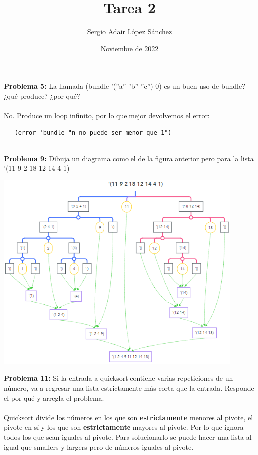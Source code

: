 \documentclass{article}
\title{Tarea 2}
\author{Sergio Adair López Sánchez}
\date{Noviembre de 2022}
\begin{document}
\maketitle

\textbf{Problema 5:} La llamada (bundle ’(”a” ”b” ”c”) 0) es un buen uso de bundle? ¿qué produce? ¿por qué?
\\\\
No. Produce un loop infinito, por lo que mejor devolvemos el error:
\begin{verbatim}
   (error 'bundle "n no puede ser menor que 1")
\end{verbatim}

\ \\
\textbf{Problema 9:} Dibuja un diagrama como el de la figura anterior pero para la lista ’(11 9 2 18 12 14 4 1)
\begin{center}
\includegraphics[width=12cm]{diagrama-quicksort.png}
\end{center}
\newpage
\textbf{Problema 11:} Si la entrada a quicksort contiene varias repeticiones de un número, va a regresar una lista estrictamente más corta que la entrada. Responde el por qué y arregla el problema.
\\\\
Quicksort divide los números en los que son \textbf{estrictamente} menores al pivote, el pivote en sí y los que son \textbf{estrictamente} mayores al pivote. Por lo que ignora todos los que sean iguales al pivote.
Para solucionarlo se puede hacer una lista al igual que smallers y largers pero de números iguales al pivote.
\end{document}
